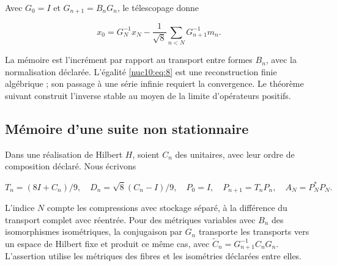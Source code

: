 Avec \(G_0=I\) et \(G_{n+1}=B_nG_n\), le télescopage donne




\begin{equation}
x_0=G_N^{-1}x_N-\frac1{\sqrt8}\sum_{n<N}G_{n+1}^{-1}m_n.
\label{nuc10:eq:8}
\end{equation}



La mémoire est l’incrément par rapport au transport entre formes \(B_n\), avec la normalisation déclarée. L’égalité \eqref{nuc10:eq:8} est une reconstruction finie algébrique ; son passage à une série infinie requiert la convergence. Le théorème suivant construit l’inverse stable au moyen de la limite d’opérateurs positifs.


\subsection{Mémoire d’une suite non stationnaire}

Dans une réalisation de Hilbert \(H\), soient \(C_n\) des unitaires, avec leur ordre de composition déclaré. Nous écrivons



\[
T_n=(8I+C_n)/9,\quad D_n=\sqrt8(C_n-I)/9,
\quad P_0=I,\quad P_{n+1}=T_nP_n,\quad A_N=P_N^*P_N.
\]



L’indice \(N\) compte les compressions avec stockage séparé, à la différence du transport complet avec réentrée. Pour des métriques variables avec \(B_n\) des isomorphismes isométriques, la conjugaison par \(G_n\) transporte les transports vers un espace de Hilbert fixe et produit ce même cas, avec \(\widetilde C_n=G_{n+1}^{-1}C_nG_n\). L’assertion utilise les métriques des fibres et les isométries déclarées entre elles.

